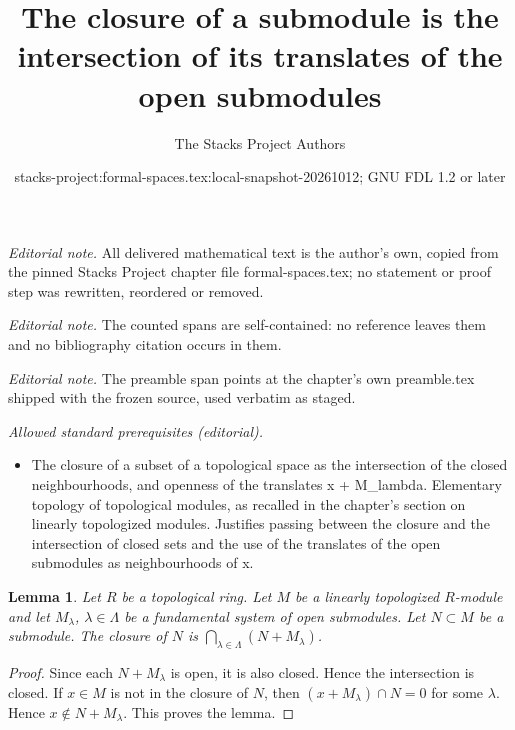 \documentclass{stacks-project}
\title{The closure of a submodule is the intersection of its translates of the open submodules}
\author{The Stacks Project Authors}
\date{stacks-project:formal-spaces.tex:local-snapshot-20261012; GNU FDL 1.2 or later}
\theoremstyle{plain}
\newtheorem{lemma}[subsection]{Lemma}
\theoremstyle{definition}
\theoremstyle{remark}
\numberwithin{equation}{subsection}
\begin{document}
\maketitle
\noindent\textit{Editorial note.} All delivered mathematical text is the author's own, copied from the pinned Stacks Project chapter file formal-spaces.tex; no statement or proof step was rewritten, reordered or removed.\par\medskip
\noindent\textit{Editorial note.} The counted spans are self-contained: no reference leaves them and no bibliography citation occurs in them.\par\medskip
\noindent\textit{Editorial note.} The preamble span points at the chapter's own preamble.tex shipped with the frozen source, used verbatim as staged.\par\medskip
\noindent\textit{Allowed standard prerequisites (editorial).}\begin{itemize}
\item The closure of a subset of a topological space as the intersection of the closed neighbourhoods, and openness of the translates x + M\_lambda. Elementary topology of topological modules, as recalled in the chapter's section on linearly topologized modules. Justifies passing between the closure and the intersection of closed sets and the use of the translates of the open submodules as neighbourhoods of x.
\end{itemize}\medskip
\begin{lemma}
\label{lemma-closed}
Let $R$ be a topological ring. Let $M$ be a linearly topologized
$R$-module and let $M_\lambda$, $\lambda \in \Lambda$ be a fundamental
system of open submodules. Let $N \subset M$ be a submodule.
The closure of $N$ is $\bigcap_{\lambda \in \Lambda} (N + M_\lambda)$.
\end{lemma}

\begin{proof}
Since each $N + M_\lambda$ is open, it is also closed. Hence the
intersection is closed. If $x \in M$ is not in the closure of $N$,
then $(x + M_\lambda) \cap N = 0$ for some $\lambda$. Hence
$x \not \in N + M_\lambda$. This proves the lemma.
\end{proof}
\end{document}
